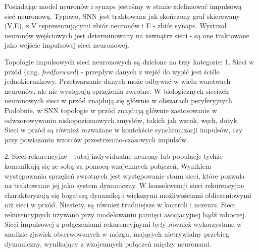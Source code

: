 Posiadając model neuronów i synaps jesteśmy w stanie zdefiniować impulsową sieć neuronową. Typowo, SNN jest traktowana jak skończony graf skierowany (V,E), z V reprezentującymi zbiór neuronów i E - zbiór synaps. Wystrzał neuronów wejściowych jest determinowany na zewnątrz sieci - są one traktowane jako wejście impulsowej sieci neuronowej.

Topologie impulsowych sieci neuronowych są dzielone na trzy kategorie:
1. Sieci w przód (ang. \textit{feedforward}) - przepływ danych z wejść do wyjść jest ściśle jednokierunkowy. Przetwarzanie danych może odbywać w wielu warstwach neuronów, ale nie występują sprzężenia zwrotne. W biologicznych sieciach neuronowych sieci w przód znajdują się głównie w obszarach peryferyjnych. Podobnie, w SNN topologie w przód znajdują głównie zastosowanie w odwzorowywaniu niskopoziomowych zmysłów, takich jak wzrok, węch, dotyk. Sieci w przód są również rozważane w kontekście synchronizacji impulsów, czy przy powiazaniu wzorców przestrzenno-czasowych impulsów.

2. Sieci rekurencyjne - tutaj indywidualne neurony lub populacje tychże komunikują się ze sobą za pomocą wzajemnych połączeń. Wynikiem występowania sprzężeń zwrotnych jest występowanie stanu sieci, które pozwala na traktowanie jej jako system dynamiczny. W konsekwencji sieci rekurencyjne charakteryzują się bogatszą dynamiką i większymi możliwościami obliczeniowymi niż sieci w przód. Niestety, są również trudniejsze w kontroli i uczeniu. Sieci rekurencyjnych używano przy modelowaniu pamięci asocjacyjnej bądź roboczej. Sieci impulsowej z połączeniami rekurencyjnymi były również wykorzystane w analizie zjawisk obserwowanych w mózgu, mających nietrywialny przebieg dynamiczny, wynikający z wzajemnych połączeń między neuronami. 

